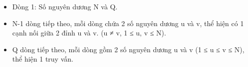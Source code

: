 \begin{itemize}
	\item      Dòng 1: Số nguyên dương N và Q.    
	\item      N-1 dòng tiếp theo, mỗi dòng chứa 2 số nguyên dương u và v, thể hiện có 1 cạnh nối giữa 2 đỉnh u và v. (u ≠ v, 1 ≤ u, v ≤ N).    
	\item      Q dòng tiếp theo, mỗi dòng gồm 2 số nguyên dương u và v (1 ≤ u ≤ v ≤ N), thể hiện 1 truy vấn.    
\end{itemize}
